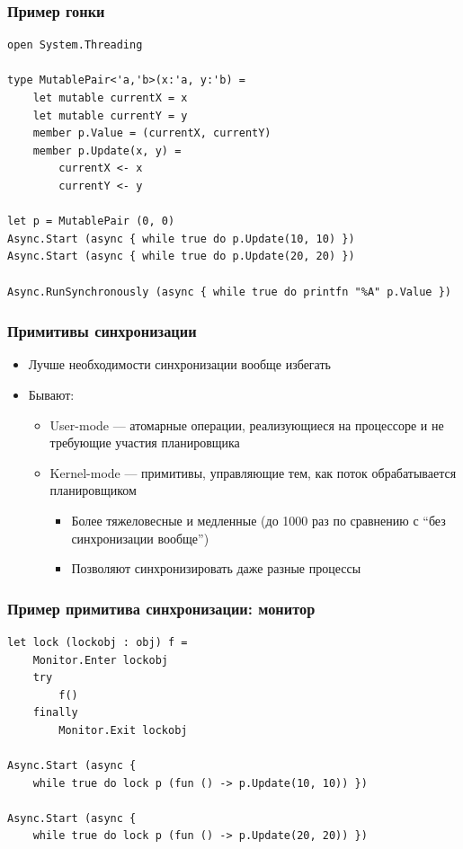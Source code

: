 \documentclass[xetex,mathserif,serif]{beamer}
\begin{document}
	\begin{frame}[fragile]
		\frametitle{Пример гонки}
		\begin{verbatim}
open System.Threading

type MutablePair<'a,'b>(x:'a, y:'b) =
    let mutable currentX = x
    let mutable currentY = y
    member p.Value = (currentX, currentY)
    member p.Update(x, y) =
        currentX <- x
        currentY <- y

let p = MutablePair (0, 0)
Async.Start (async { while true do p.Update(10, 10) })
Async.Start (async { while true do p.Update(20, 20) })

Async.RunSynchronously (async { while true do printfn "%A" p.Value })
		\end{verbatim}
	\end{frame}

	\begin{frame}
		\frametitle{Примитивы синхронизации}
		\begin{itemize}
			\item Лучше необходимости синхронизации вообще избегать
			\item Бывают:
			\begin{itemize}
				\item User-mode --- атомарные операции, реализующиеся на процессоре и не требующие участия планировщика
				\item Kernel-mode --- примитивы, управляющие тем, как поток обрабатывается планировщиком
				\begin{itemize}
					\item Более тяжеловесные и медленные (до 1000 раз по сравнению с ``без синхронизации вообще'')
					\item Позволяют синхронизировать даже разные процессы
				\end{itemize}
			\end{itemize}
		\end{itemize}
	\end{frame}

	\begin{frame}[fragile]
		\frametitle{Пример примитива синхронизации: монитор}
		\begin{verbatim}
let lock (lockobj : obj) f =
    Monitor.Enter lockobj
    try
        f()
    finally
        Monitor.Exit lockobj

Async.Start (async { 
    while true do lock p (fun () -> p.Update(10, 10)) })

Async.Start (async { 
    while true do lock p (fun () -> p.Update(20, 20)) })
		\end{verbatim}
	\end{frame}
\end{document}
